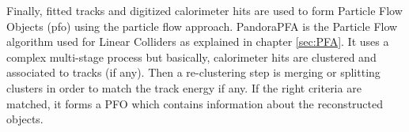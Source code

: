 Finally, fitted tracks and digitized calorimeter hits are used to form Particle Flow Objects (\acrshort{pfo}) using the particle flow approach. PandoraPFA \cite{Thomson:2009rp} is the Particle Flow algorithm used for Linear Colliders as explained in chapter \ref{sec:PFA}. It uses a complex multi-stage process but basically, calorimeter hits are clustered and associated to tracks (if any). Then a re-clustering step is merging or splitting clusters in order to match the track energy if any. If the right criteria are matched, it forms a PFO which contains information about the reconstructed objects.\\[0.1cm]



